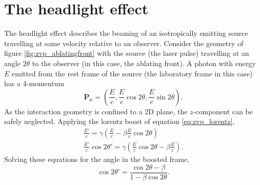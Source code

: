 \section{The headlight effect}\label{sec:app_headlight}
The headlight effect describes the beaming of an isotropically emitting source travelling at some velocity relative to an observer. Consider the geometry of figure \ref{fig:zvp_ablatingfront} with the source (the laser pulse) travelling at an angle $2\theta$ to the observer (in this case, the ablating front). A photon with energy $E$ emitted from the rest frame of the source (the laboratory frame in this case) has a 4-momentum
\begin{equation}
	\mathbf{P}_\mu = \left(\frac{E}{c},\frac{E}{c}\cos{2\theta},\frac{E}{c}\sin{2\theta}\right).
\end{equation}
As the interaction geometry is confined to a 2D plane,  the $z$-component can be safely neglected. Applying the lorentz boost of equation \ref{eq:zvp_lorentz},
\begin{equation}
	\begin{split}
		\frac{E'}{c} = \gamma \left( \frac{E}{c} - \beta \frac{E}{c}\cos{2\theta}\right) \\
		\frac{E'}{c}\cos{2\theta'} = \gamma \left( \frac{E}{c}\cos{2\theta} - \beta \frac{E}{c}\right).
	\end{split}
\end{equation}
Solving these equations for the angle in the boosted frame,
\begin{equation}
	\cos{2\theta'} = \frac{\cos{2\theta} - \beta}{1-\beta\cos{2\theta}}.
\end{equation}

